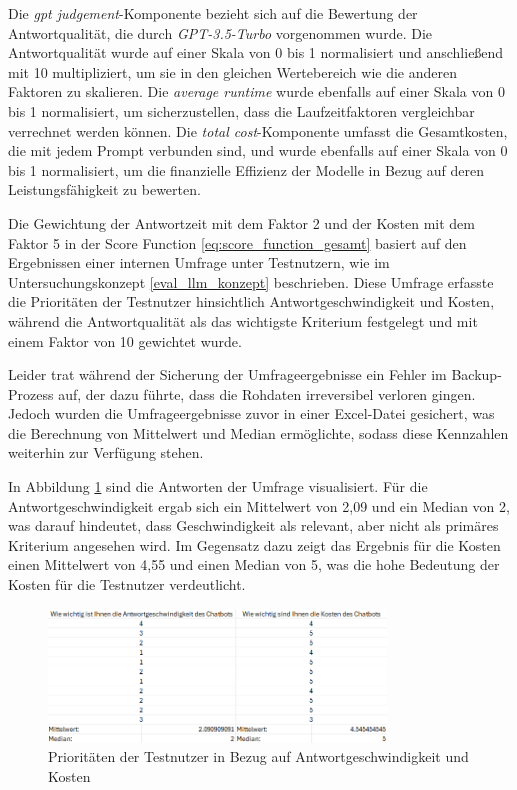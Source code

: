Die \textit{gpt judgement}-Komponente bezieht sich auf die Bewertung der Antwortqualität, die durch \textit{GPT-3.5-Turbo} vorgenommen wurde. 
Die Antwortqualität wurde auf einer Skala von 0 bis 1 normalisiert und anschließend mit 10 multipliziert, um sie in den gleichen Wertebereich wie die anderen Faktoren zu skalieren. 
Die \textit{average runtime} wurde ebenfalls auf einer Skala von 0 bis 1 normalisiert, um sicherzustellen, dass die Laufzeitfaktoren vergleichbar verrechnet werden können. 
Die \textit{total cost}-Komponente umfasst die Gesamtkosten, die mit jedem Prompt verbunden sind, und wurde ebenfalls auf einer Skala von 0 bis 1 normalisiert, 
um die finanzielle Effizienz der Modelle in Bezug auf deren Leistungsfähigkeit zu bewerten.

Die Gewichtung der Antwortzeit mit dem Faktor 2 und der Kosten mit dem Faktor 5 in der Score Function \ref{eq:score_function_gesamt} basiert auf den Ergebnissen einer internen Umfrage unter Testnutzern, 
wie im Untersuchungskonzept \ref{eval_llm_konzept} beschrieben. Diese Umfrage erfasste die Prioritäten der Testnutzer hinsichtlich Antwortgeschwindigkeit und Kosten, 
während die Antwortqualität als das wichtigste Kriterium festgelegt und mit einem Faktor von 10 gewichtet wurde.

Leider trat während der Sicherung der Umfrageergebnisse ein Fehler im Backup-Prozess auf, der dazu führte, dass die Rohdaten irreversibel verloren gingen. 
Jedoch wurden die Umfrageergebnisse zuvor in einer Excel-Datei gesichert, was die Berechnung von Mittelwert und Median ermöglichte, sodass diese Kennzahlen weiterhin zur Verfügung stehen.

In Abbildung \ref{fig:prioritäten} sind die Antworten der Umfrage visualisiert. 
Für die Antwortgeschwindigkeit ergab sich ein Mittelwert von 2,09 und ein Median von 2, was darauf hindeutet, dass Geschwindigkeit als relevant, aber nicht als primäres Kriterium angesehen wird. 
Im Gegensatz dazu zeigt das Ergebnis für die Kosten einen Mittelwert von 4,55 und einen Median von 5, was die hohe Bedeutung der Kosten für die Testnutzer verdeutlicht.

\begin{figure}[H]
    \centering
    \includegraphics[width=0.8\textwidth]{img/prioritaeten.png}
    \caption{Prioritäten der Testnutzer in Bezug auf Antwortgeschwindigkeit und Kosten}
    \label{fig:prioritäten}
\end{figure}

